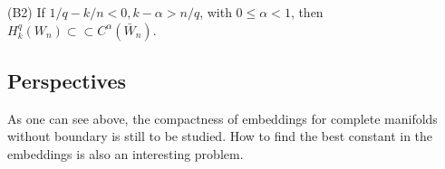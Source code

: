 \documentclass[12pt,hyperref,a4paper,UTF8]{ctexart}
\begin{document}
\vskip 2pt
(B2) If $1/q-k/n<0, {k-\alpha>n / q}$, with ${0 \leq \alpha<1}$, then ${H_k^q\left(W_n\right) \subset\subset C^\alpha\left(\bar{W}_n\right)}$. 


\subsection{Perspectives}
As one can see above, the compactness of embeddings for complete manifolds without boundary is still to be studied. 
How to find the best constant in the embeddings is also an interesting problem.








\newpage
{}
\end{document}

